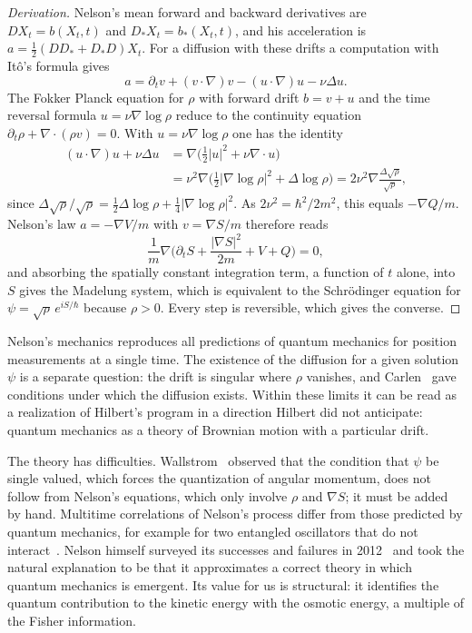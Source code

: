\begin{proof}[Derivation]
Nelson's mean forward and backward derivatives are $DX_t = b(X_t,t)$ and $D_*X_t = b_*(X_t,t)$, and his acceleration is $a = \frac12(DD_*+D_*D)X_t$. For a diffusion with these drifts a computation with It\^o's formula gives
\[
a = \partial_tv+(v\cdot\nabla)v-(u\cdot\nabla)u-\nu\Delta u.
\]
The Fokker Planck equation for $\rho$ with forward drift $b = v+u$ and the time reversal formula $u = \nu\nabla\log\rho$ reduce to the continuity equation $\partial_t\rho+\nabla\cdot(\rho v) = 0$. With $u = \nu\nabla\log\rho$ one has the identity
\[
\begin{aligned}(u\cdot\nabla)u+\nu\Delta u &= \nabla\Big(\frac12|u|^2+\nu\nabla\cdot u\Big)\\ &= \nu^2\nabla\Big(\frac12|\nabla\log\rho|^2+\Delta\log\rho\Big) = 2\nu^2\nabla\frac{\Delta\sqrt\rho}{\sqrt\rho},\end{aligned}
\]
since $\Delta\sqrt\rho/\sqrt\rho = \frac12\Delta\log\rho+\frac14|\nabla\log\rho|^2$. As $2\nu^2 = \hbar^2/2m^2$, this equals $-\nabla Q/m$. Nelson's law $a = -\nabla V/m$ with $v = \nabla S/m$ therefore reads
\[
\frac1m\nabla\Big(\partial_tS+\frac{|\nabla S|^2}{2m}+V+Q\Big) = 0,
\]
and absorbing the spatially constant integration term, a function of $t$ alone, into $S$ gives the Madelung system, which is equivalent to the Schr\"odinger equation for $\psi = \sqrt\rho\,e^{iS/\hbar}$ because $\rho>0$. Every step is reversible, which gives the converse.
\end{proof}

Nelson's mechanics reproduces all predictions of quantum mechanics for position measurements at a single time. The existence of the diffusion for a given solution $\psi$ is a separate question: the drift is singular where $\rho$ vanishes, and Carlen~\cite{carlen1984} gave conditions under which the diffusion exists. Within these limits it can be read as a realization of Hilbert's program in a direction Hilbert did not anticipate: quantum mechanics as a theory of Brownian motion with a particular drift.

The theory has difficulties. Wallstrom~\cite{wallstrom1994} observed that the condition that $\psi$ be single valued, which forces the quantization of angular momentum, does not follow from Nelson's equations, which only involve $\rho$ and $\nabla S$; it must be added by hand. Multitime correlations of Nelson's process differ from those predicted by quantum mechanics, for example for two entangled oscillators that do not interact~\cite{nelson2012}. Nelson himself surveyed its successes and failures in 2012~\cite{nelson2012} and took the natural explanation to be that it approximates a correct theory in which quantum mechanics is emergent. Its value for us is structural: it identifies the quantum contribution to the kinetic energy with the osmotic energy, a multiple of the Fisher information.

